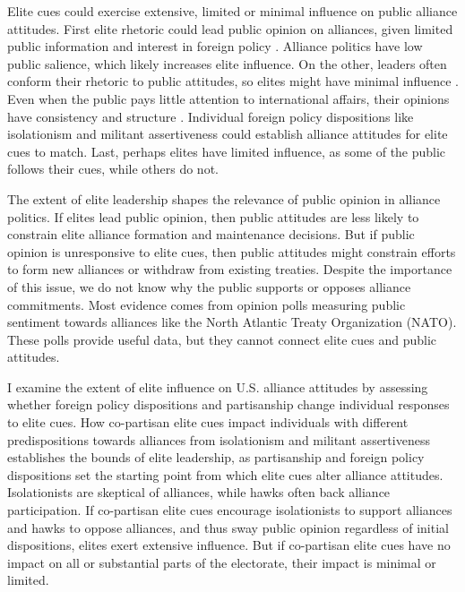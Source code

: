 \documentclass[12pt]{article}
\begin{document}
Elite cues could exercise extensive, limited or minimal influence on public alliance attitudes. 
First elite rhetoric could lead public opinion on alliances, given limited public information and interest in foreign policy \citep{Canes-Wrone2006, BaumPotter2008, Druckman2014}.
Alliance politics have low public salience, which likely increases elite influence. 
On the other, leaders often conform their rhetoric to public attitudes, so elites might have minimal influence \citep{Barberaetal2019, HagerHilbig2020}.
Even when the public pays little attention to international affairs, their opinions have consistency and structure \citep{Holsti1992, PageShapiro1992}.
Individual foreign policy dispositions like isolationism and militant assertiveness \citep{KertzerZeitzoff2017} could establish alliance attitudes for elite cues to match.
Last, perhaps elites have limited influence, as some of the public follows their cues, while others do not. 


The extent of elite leadership shapes the relevance of public opinion in alliance politics.
If elites lead public opinion, then public attitudes are less likely to constrain elite alliance formation and maintenance decisions.
But if public opinion is unresponsive to elite cues, then public attitudes might constrain efforts to form new alliances or withdraw from existing treaties. 
Despite the importance of this issue, we do not know why the public supports or opposes alliance commitments. 
Most evidence comes from opinion polls measuring public sentiment towards alliances like the North Atlantic Treaty Organization (NATO).
These polls provide useful data, but they cannot connect elite cues and public attitudes.


I examine the extent of elite influence on U.S. alliance attitudes by assessing whether foreign policy dispositions and partisanship change individual responses to elite cues.
How co-partisan elite cues impact individuals with different predispositions towards alliances from isolationism and militant assertiveness establishes the bounds of elite leadership, as partisanship and foreign policy dispositions set the starting point from which elite cues alter alliance attitudes. 
Isolationists are skeptical of alliances, while hawks often back alliance participation. 
If co-partisan elite cues encourage isolationists to support alliances and hawks to oppose alliances, and thus sway public opinion regardless of initial dispositions, elites exert extensive influence. 
But if co-partisan elite cues have no impact on all or substantial parts of the electorate, their impact is minimal or limited.
\end{document}
